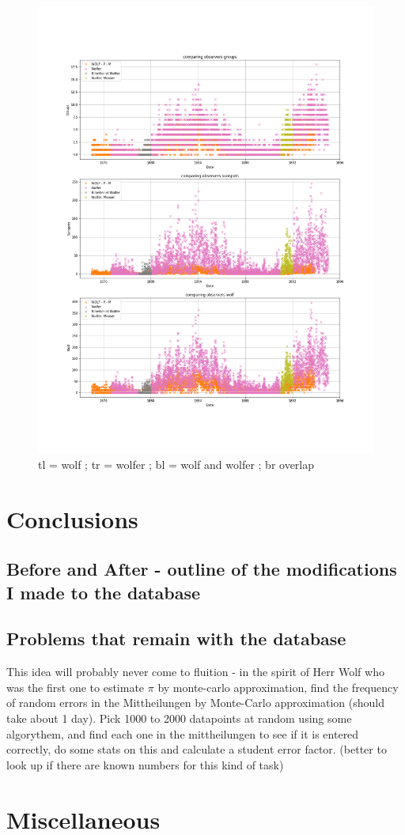 \documentclass[12pt]{article}
\begin{document}
\begin{figure}[H]
    \includegraphics[width=0.5\linewidth]{wolf_and_wolfer_overlap.png}
    \caption{tl = wolf ; tr = wolfer ; bl = wolf and wolfer ; br overlap}
    \label{fig:wolf and wolfer initial plots}
\end{figure}

\section{Conclusions}

\subsection{Before and After - outline of the modifications I made to the database}

\subsection{Problems that remain with the database}

This idea will probably never come to fluition - in the spirit of Herr Wolf who was the first one to estimate $\pi$ by monte-carlo approximation, find the frequency of random errors in the Mittheilungen by Monte-Carlo approximation (should take about 1 day). Pick 1000 to 2000 datapoints at random using some algorythem, and find each one in the mittheilungen to see if it is entered correctly, do some stats on this and calculate a student error factor. (better to look up if there are known numbers for this kind of task)

\section{Miscellaneous}
\end{document}
